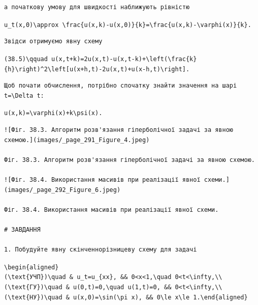 \documentclass[
  ukrainian,
]{article}
\begin{document}
\begin{verbatim}
а початкову умову для швидкості наближують рівністю
\end{verbatim}

\texttt{u\_t(x,0)\textbackslash{}approx\ \textbackslash{}frac\{u(x,k)-u(x,0)\}\{k\}=\textbackslash{}frac\{u(x,k)-\textbackslash{}varphi(x)\}\{k\}.}

\begin{verbatim}
Звідси отримуємо явну схему
\end{verbatim}

\texttt{(38.5)\textbackslash{}qquad\ u(x,t+k)=2u(x,t)-u(x,t-k)+\textbackslash{}left(\textbackslash{}frac\{k\}\{h\}\textbackslash{}right)\^{}2\textbackslash{}left{[}u(x+h,t)-2u(x,t)+u(x-h,t)\textbackslash{}right{]}.}

\begin{verbatim}
Щоб почати обчислення, потрібно спочатку знайти значення на шарі t=\Delta t:
\end{verbatim}

\texttt{u(x,k)=\textbackslash{}varphi(x)+k\textbackslash{}psi(x).}

\begin{verbatim}
![Фіг. 38.3. Алгоритм розв'язання гіперболічної задачі за явною схемою.](images/_page_291_Figure_4.jpeg)

Фіг. 38.3. Алгоритм розв'язання гіперболічної задачі за явною схемою.

![Фіг. 38.4. Використання масивів при реалізації явної схеми.](images/_page_292_Figure_6.jpeg)

Фіг. 38.4. Використання масивів при реалізації явної схеми.

# ЗАВДАННЯ

1. Побудуйте явну скінченнорізницеву схему для задачі
\end{verbatim}

\texttt{\textbackslash{}begin\{aligned\}(\textbackslash{}text\{УЧП\})\textbackslash{}quad\ \&\ u\_t=u\_\{xx\},\ \&\&\ 0\textless{}x\textless{}1,\textbackslash{}quad\ 0\textless{}t\textless{}\textbackslash{}infty,\textbackslash{}\textbackslash{}(\textbackslash{}text\{ГУ\})\textbackslash{}quad\ \&\ u(0,t)=0,\textbackslash{}quad\ u(1,t)=0,\ \&\&\ 0\textless{}t\textless{}\textbackslash{}infty,\textbackslash{}\textbackslash{}(\textbackslash{}text\{НУ\})\textbackslash{}quad\ \&\ u(x,0)=\textbackslash{}sin(\textbackslash{}pi\ x),\ \&\&\ 0\textbackslash{}le\ x\textbackslash{}le\ 1.\textbackslash{}end\{aligned\}}
\end{document}
